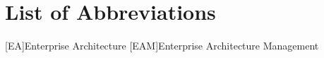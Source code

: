 
\chapter*{List of Abbreviations}

\begin{acronym}[ewuifbwejkbfjksbjkcbsdjcjkn3j]%

[EA]{Enterprise Architecture}
[EAM]{Enterprise Architecture Management}


\end{acronym}